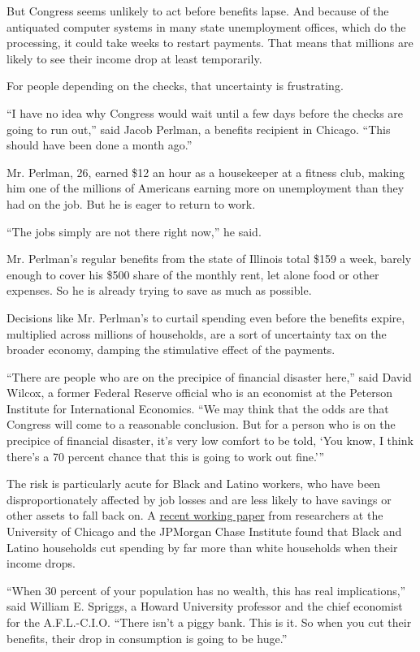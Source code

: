 But Congress seems unlikely to act before benefits lapse. And because of
the antiquated computer systems in many state unemployment offices,
which do the processing, it could take weeks to restart payments. That
means that millions are likely to see their income drop at least
temporarily.

For people depending on the checks, that uncertainty is frustrating.

``I have no idea why Congress would wait until a few days before the
checks are going to run out,'' said Jacob Perlman, a benefits recipient
in Chicago. ``This should have been done a month ago.''

Mr. Perlman, 26, earned \$12 an hour as a housekeeper at a fitness club,
making him one of the millions of Americans earning more on unemployment
than they had on the job. But he is eager to return to work.

``The jobs simply are not there right now,'' he said.

Mr. Perlman's regular benefits from the state of Illinois total \$159 a
week, barely enough to cover his \$500 share of the monthly rent, let
alone food or other expenses. So he is already trying to save as much as
possible.

Decisions like Mr. Perlman's to curtail spending even before the
benefits expire, multiplied across millions of households, are a sort of
uncertainty tax on the broader economy, damping the stimulative effect
of the payments.

``There are people who are on the precipice of financial disaster
here,'' said David Wilcox, a former Federal Reserve official who is an
economist at the Peterson Institute for International Economics. ``We
may think that the odds are that Congress will come to a reasonable
conclusion. But for a person who is on the precipice of financial
disaster, it's very low comfort to be told, `You know, I think there's a
70 percent chance that this is going to work out fine.'''

The risk is particularly acute for Black and Latino workers, who have
been disproportionately affected by job losses and are less likely to
have savings or other assets to fall back on. A
\href{https://www.nber.org/papers/w27552}{recent working paper} from
researchers at the University of Chicago and the JPMorgan Chase
Institute found that Black and Latino households cut spending by far
more than white households when their income drops.

``When 30 percent of your population has no wealth, this has real
implications,'' said William E. Spriggs, a Howard University professor
and the chief economist for the A.F.L.-C.I.O. ``There isn't a piggy
bank. This is it. So when you cut their benefits, their drop in
consumption is going to be huge.''

